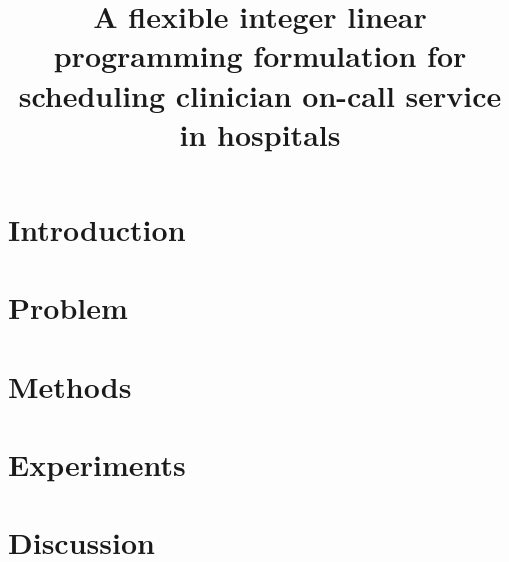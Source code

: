 \documentclass[]{article}
\title{A flexible integer linear programming formulation for scheduling
	clinician on-call service in hospitals}
\begin{document}
	\maketitle
	\begin{abstract}
		
	\end{abstract}
	
	\section{Introduction}\label{sec:introduction}
	
	\section{Problem}\label{sec:problem}
	
	\section{Methods}\label{sec:methods}
	
	\section{Experiments}\label{sec:experiments}
	
	\section{Discussion}\label{sec:discussion}
	
	
	
	
\end{document}
